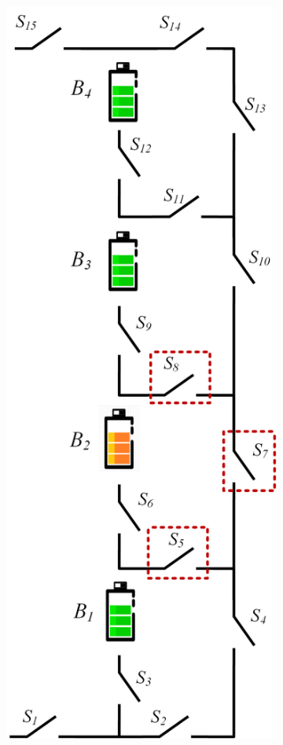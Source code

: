 \documentclass{article}
\begin{document}
\begin{figure}[htbp]
    \centering
    \begin{subfigure}[b]{0.15\textwidth}
        \includegraphics[width=\textwidth]{../attachments/arch-e.png}

\end{subfigure}
\end{figure}
\end{document}
